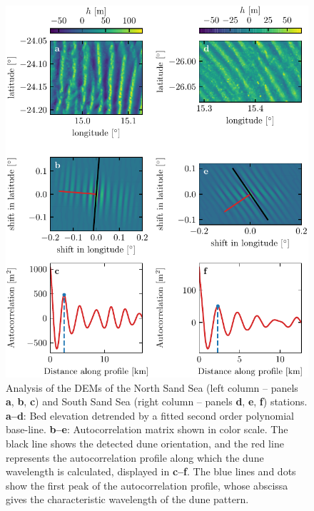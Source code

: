 \begin{figure}[p]
  \centering
  \includegraphics[scale=1]{Figures/Figure4_supp.pdf}
  \caption{Analysis of the DEMs of the North Sand Sea (left column -- panels \textbf{a}, \textbf{b}, \textbf{c}) and South Sand Sea (right column -- panels \textbf{d}, \textbf{e}, \textbf{f}) stations. \textbf{a--d}: Bed elevation detrended by a fitted second order polynomial base-line. \textbf{b--e}: Autocorrelation matrix shown in color scale. The black line shows the detected dune orientation, and the red line represents the autocorrelation profile along which the dune wavelength is calculated, displayed in \textbf{c--f}. The blue lines and dots show the first peak of the autocorrelation profile, whose abscissa gives the characteristic wavelength of the dune pattern.}
  \label{Fig4_supp}
\end{figure}

